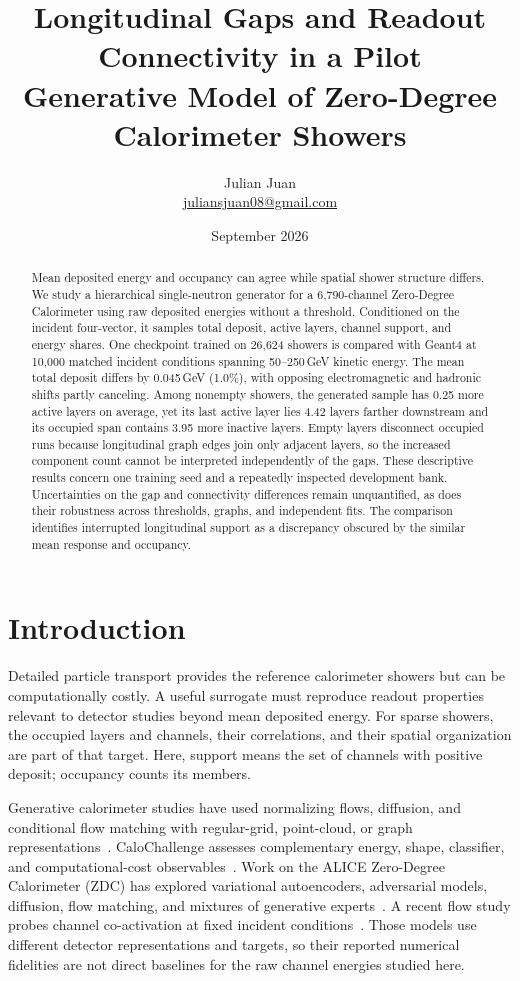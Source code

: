 \documentclass[11pt]{article}
\title{Longitudinal Gaps and Readout Connectivity in a Pilot\\Generative Model of Zero-Degree Calorimeter Showers}
\author{Julian Juan\\[3pt]\small\href{mailto:juliansjuan08@gmail.com}{juliansjuan08@gmail.com}}
\date{September 2026}
\begin{document}
\maketitle

\begin{abstract}
Mean deposited energy and occupancy can agree while spatial shower structure differs. We study a hierarchical single-neutron generator for a 6,790-channel Zero-Degree Calorimeter using raw deposited energies without a threshold. Conditioned on the incident four-vector, it samples total deposit, active layers, channel support, and energy shares. One checkpoint trained on 26,624 showers is compared with Geant4 at 10,000 matched incident conditions spanning 50--250\,GeV kinetic energy. The mean total deposit differs by 0.045\,GeV (1.0\%), with opposing electromagnetic and hadronic shifts partly canceling. Among nonempty showers, the generated sample has 0.25 more active layers on average, yet its last active layer lies 4.42 layers farther downstream and its occupied span contains 3.95 more inactive layers. Empty layers disconnect occupied runs because longitudinal graph edges join only adjacent layers, so the increased component count cannot be interpreted independently of the gaps. These descriptive results concern one training seed and a repeatedly inspected development bank. Uncertainties on the gap and connectivity differences remain unquantified, as does their robustness across thresholds, graphs, and independent fits. The comparison identifies interrupted longitudinal support as a discrepancy obscured by the similar mean response and occupancy.
\end{abstract}

\section{Introduction}

Detailed particle transport provides the reference calorimeter showers but can be computationally costly. A useful surrogate must reproduce readout properties relevant to detector studies beyond mean deposited energy. For sparse showers, the occupied layers and channels, their correlations, and their spatial organization are part of that target. Here, support means the set of channels with positive deposit; occupancy counts its members.

Generative calorimeter studies have used normalizing flows, diffusion, and conditional flow matching with regular-grid, point-cloud, or graph representations~\cite{caloflow,calodiffusion,calograph,caloclouds2,calodream}. CaloChallenge assesses complementary energy, shape, classifier, and computational-cost observables~\cite{calochallenge,kansalmetrics}. Work on the ALICE Zero-Degree Calorimeter (ZDC) has explored variational autoencoders, adversarial models, diffusion, flow matching, and mixtures of generative experts~\cite{dubinskizdc,kitazdc,fasterzdc,expertsim,wojnar2025}. A recent flow study probes channel co-activation at fixed incident conditions~\cite{majerz2026}. Those models use different detector representations and targets, so their reported numerical fidelities are not direct baselines for the raw channel energies studied here.
\end{document}
